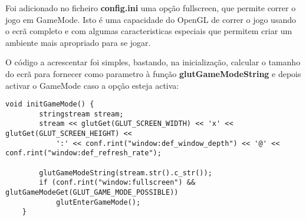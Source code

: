 Foi adicionado no ficheiro \textbf{config.ini} uma opção fullscreen, que permite correr o jogo em GameMode. Isto é uma capacidade do OpenGL de correr o jogo usando o ecrã completo e com algumas caracteristicas especiais que permitem criar um ambiente mais apropriado para se jogar.

O código a acrescentar foi simples, bastando, na inicialização, calcular o tamanho do ecrã para fornecer como parametro à função \textbf{glutGameModeString} e depois activar o GameMode caso a opção esteja activa:

\begin{lstlisting}[caption=Activação do Game Mode]
	void initGameMode() {
		stringstream stream;
		stream << glutGet(GLUT_SCREEN_WIDTH) << 'x' << glutGet(GLUT_SCREEN_HEIGHT) <<
			':' << conf.rint("window:def_window_depth") << '@' << conf.rint("window:def_refresh_rate");

		glutGameModeString(stream.str().c_str());
		if (conf.rint("window:fullscreen") && glutGameModeGet(GLUT_GAME_MODE_POSSIBLE))
			glutEnterGameMode();
	}
\end{lstlisting}
